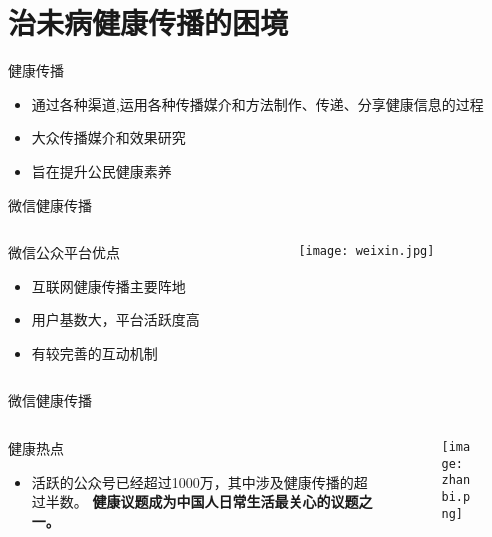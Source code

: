 \section{治未病健康传播的困境}
\begin{frame}{健康传播}
\centering
\begin{itemize}
    \item 通过各种渠道,运用各种传播媒介和方法制作、传递、分享健康信息的过程
    \item 大众传播媒介和效果研究
    \item 旨在提升公民健康素养
\end{itemize}
\end{frame}
\begin{frame}{微信健康传播}
\begin{columns}
    \begin{column}{0.5\textwidth}
        \begin{block}{微信公众平台优点}
            \begin{itemize}
                \item 互联网健康传播主要阵地
                \item 用户基数大，平台活跃度高
                \item 有较完善的互动机制
            \end{itemize}
        \end{block}
    \end{column}
    \begin{column}{0.5\textwidth}
        \begin{figure}[h]
            \texttt{[image: weixin.jpg]}
        \end{figure}
    \end{column}
\end{columns}
\end{frame}
\begin{frame}{微信健康传播}
\begin{columns}
\begin{column}{0.5\textwidth}
\begin{exampleblock}{健康热点}
    \begin{itemize}
        \item 活跃的公众号已经超过1000万，其中涉及健康传播的超过半数。
        \vfill
    \textbf{健康议题成为中国人日常生活最关心的议题之一。}
    \end{itemize}
\end{exampleblock}
\end{column}
\begin{column}{0.5\textwidth}

\begin{figure}[h]
\texttt{[image: zhanbi.png]}
\end{figure}

\end{column}
\end{columns}
\end{frame}

